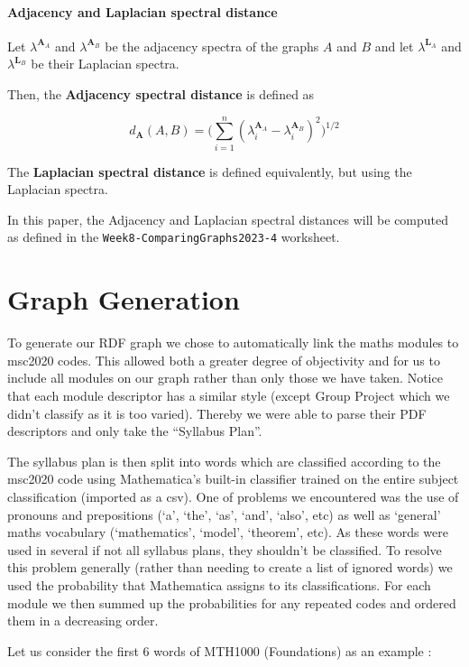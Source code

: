 \documentclass[english, 12pt]{article}
\begin{document}
\paragraph{Adjacency and Laplacian spectral distance} \label{sec:spectral_distance}
Let $\lambda^{\mathbf A_A}$ and  $\lambda^{\mathbf A_B}$ be the adjacency spectra of the graphs $A$ and $B$ and let $\lambda^{\mathbf L_A}$ and  $\lambda^{\mathbf L_B}$ be their Laplacian spectra.

Then, the {\bf Adjacency spectral distance} is defined as

$$d_{\mathbf A}(A,B) = \Bigg( \sum_{i=1}^n (\lambda_i^{\mathbf A_A} - \lambda_i^{\mathbf A_B})^2\Bigg)^{1/2}$$

The {\bf Laplacian spectral distance} is defined equivalently, but using the Laplacian spectra.

In this paper, the Adjacency and Laplacian spectral distances will be computed as defined in the \texttt{Week8-ComparingGraphs2023-4} worksheet.

\section{Graph Generation} \label{sec:graph_gen}
To generate our RDF graph we chose to automatically link the maths modules to msc2020\cite{msc_2010} codes. This allowed both a greater degree of objectivity and for us to include all modules on our graph rather than only those we have taken. Notice that each module descriptor has a similar style (except Group Project which we didn't classify as it is too varied). Thereby we were able to parse their PDF descriptors and only take the ``Syllabus Plan''.

The syllabus plan is then split into words which are classified according to the msc2020 code using Mathematica's built-in classifier trained on the entire subject classification (imported as a csv). One of problems we encountered was the use of pronouns and prepositions (`a', `the', `as', `and', `also', etc) as well as `general' maths vocabulary (`mathematics', `model', `theorem', etc). As these words were used in several if not all syllabus plans, they shouldn't be classified. To resolve this problem generally (rather than needing to create a list of ignored words) we used the probability that Mathematica assigns to its classifications. For each module we then summed up the probabilities for any repeated codes and ordered them in a decreasing order.

Let us consider the first 6 words of MTH1000 (Foundations) as an example :
\end{document}
